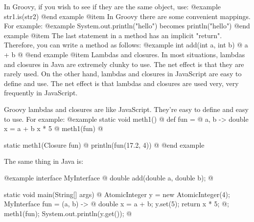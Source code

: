 In Groovy, if you wish to see if they are the same object, use:
@example   
      str1.is(str2)
@end example
@item
In Groovy there are some convenient mappings.  For example:
@example
   System.out.println("hello") becomes println("hello")
@end example
@item
The last statement in a method has an implicit "return".  Therefore,
you can write a method as follows:
@example   
   int add(int a, int b) @{
       a + b
   @}
@end example
@item
Lambdas and closures.  In most situations, lambdas and closures in
Java are extremely clunky to use.  The net effect is that they are
rarely used.  On the other hand, lambdas and closures in JavaScript
are easy to define and use.  The net effect is that lambdas and
closures are used very, very frequently in JavaScript.
   
Groovy lambdas and closures are like JavaScript.  They're easy to
define and easy to use.  For example:
@example   
       static void meth1() @{
            def fun = @{ a, b ->
                double x = a + b
                x * 5
            @}
            meth1(fun)
        @}

        static meth1(Closure fun) @{
            println(fun(17.2, 4))
        @}
@end example

The same thing in Java is:

@example
        interface MyInterface @{
            double add(double a, double b);
        @}

        static void main(String[] args) @{
            AtomicInteger y = new AtomicInteger(4);
            MyInterface fun = (a, b) -> @{
                double x = a + b;
                y.set(5);
                return x * 5;
            @};
            meth1(fun);
            System.out.println(y.get());
        @}

